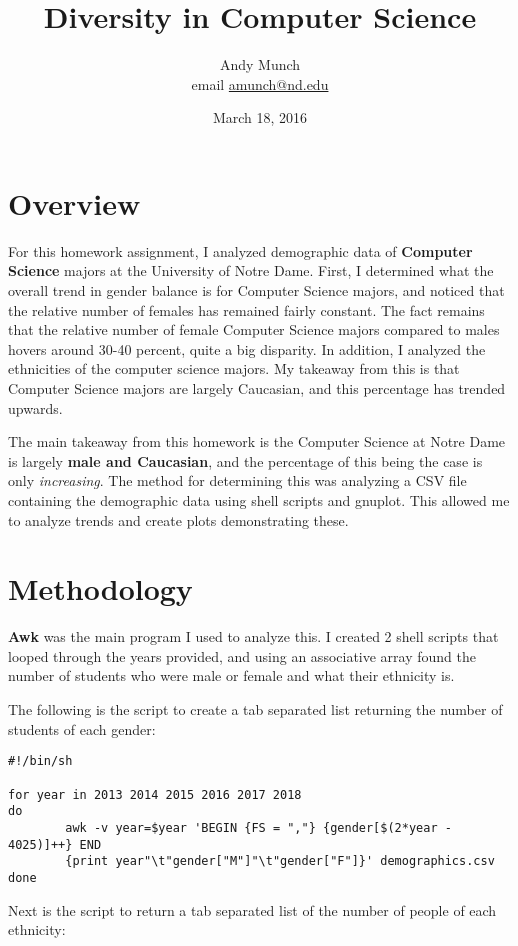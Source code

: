 \documentclass{article}
\title{Diversity in Computer Science}
\author{Andy Munch \\ email \href{mailto:amunch@nd.edu}{amunch@nd.edu}}
\date{March 18, 2016}
\begin{document}
\maketitle

\section{Overview}

For this homework assignment, I analyzed demographic data of \textbf{Computer Science} majors at the University of Notre Dame.  First, I determined what the overall trend in gender balance is for Computer Science majors, and noticed that the relative number of females has remained fairly constant.  The fact remains that the relative number of female Computer Science majors compared to males hovers around 30-40 percent, quite a big disparity.  In addition, I analyzed the ethnicities of the computer science majors.  My takeaway from this is that Computer Science majors are largely Caucasian, and this percentage has trended upwards.

The main takeaway from this homework is the Computer Science at Notre Dame is largely \textbf{male and Caucasian}, and the percentage of this being the case is only \textit{increasing}.  The method for determining this was analyzing a CSV file containing the demographic data using shell scripts and gnuplot.  This allowed me to analyze trends and create plots demonstrating these.

\section{Methodology}

\textbf{Awk} was the main program I used to analyze this.  I created 2 shell scripts that looped through the years provided, and using an associative array found the number of students who were male or female and what their ethnicity is.  

The following is the script to create a tab separated list returning the number of students of each gender:

\begin{verbatim}
#!/bin/sh

for year in 2013 2014 2015 2016 2017 2018
do
        awk -v year=$year 'BEGIN {FS = ","} {gender[$(2*year - 4025)]++} END 
        {print year"\t"gender["M"]"\t"gender["F"]}' demographics.csv
done
\end{verbatim}

Next is the script to return a tab separated list of the number of people of each ethnicity:
\end{document}
